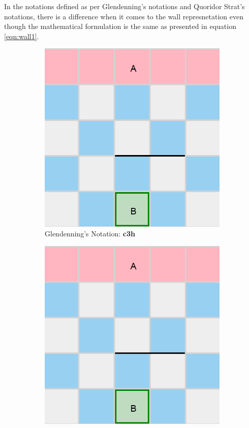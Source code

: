 In the notations defined as per Glendenning's notations and Quoridor Strat's notations, there is a difference when it comes to the wall represnetation even though the mathematical formulation is the same as presented in equation \eqref{eqn:wall1}. 

\begin{figure}[!ht]
    \begin{subfigure}{0.4\textwidth}
      \includegraphics[width=\textwidth]{../img/GameBoard/wall_repr.png}
      \caption{Glendenning's Notation: \textbf{c3h}}
      \label{fig:NotationDifferentA}
    \end{subfigure}
    \hfill
    \begin{subfigure}{0.4\textwidth}
      \includegraphics[width=\textwidth]{../img/GameBoard/wall_repr.png}

\end{subfigure}
\end{figure}
